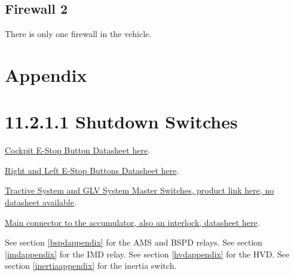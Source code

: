 \documentclass{article}
\begin{document}
    \subsection{Firewall 2}
        There is only one firewall in the vehicle.

\newpage

\section{Appendix}
\section*{11.2.1.1 Shutdown Switches} \label{shutdownappendix}

\href{http://products.eao.com/index.php?IdTreeGroup=2344&IdProduct=48667&lang=en}{Cockpit E-Stop Button Datasheet here}.

\href{http://products.eao.com/index.php?IdTreeGroup=2344&IdProduct=48533&lang=en}{Right and Left E-Stop Buttons Datasheet here}.

\href{http://www.amazon.com/Volt-Battery-Disconnect-Kill-Switch/dp/B007O0BBFM}{Tractive System and GLV System Master Switches, product link here, no datasheet available}.

\href{http://www.mouser.com/pdfdocs/9876510101.PDF}{Main connector to the accumulator, also an interlock, datasheet here}.

See section \ref{bspdappendix} for the AMS and BSPD relays.
See section \ref{imdappendix} for the IMD relay.
See section \ref{hvdappendix} for the HVD.
See section \ref{inertiaappendix} for the inertia switch.
\end{document}
